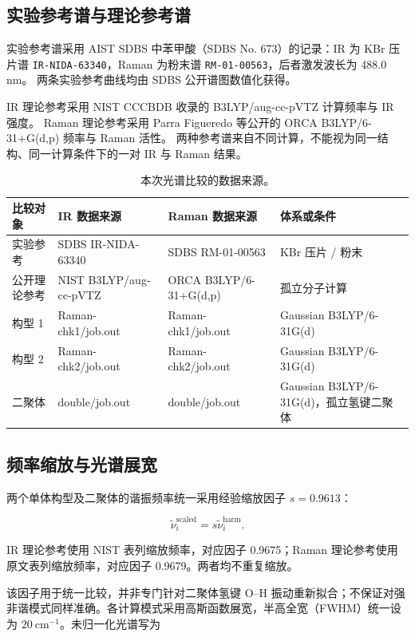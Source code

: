 \documentclass[a4paper,12pt]{article}
\begin{document}
\subsection{实验参考谱与理论参考谱}

实验参考谱采用 AIST SDBS 中苯甲酸（SDBS No. 673）的记录：IR 为 KBr 压片谱 \nolinkurl{IR-NIDA-63340}，Raman 为粉末谱 \nolinkurl{RM-01-00563}，后者激发波长为 488.0 nm。\cite{ref1} 两条实验参考曲线均由 SDBS 公开谱图数值化获得。

IR 理论参考采用 NIST CCCBDB 收录的 B3LYP/aug-cc-pVTZ 计算频率与 IR 强度。\cite{ref2} Raman 理论参考采用 Parra Figueredo 等公开的 ORCA B3LYP/6-31+G(d,p) 频率与 Raman 活性。\cite{ref3} 两种参考谱来自不同计算，不能视为同一结构、同一计算条件下的一对 IR 与 Raman 结果。

\begin{table}[htbp]
\centering
\caption{本次光谱比较的数据来源。}\label{tab:1}
\begingroup\footnotesize\setlength{\tabcolsep}{4pt}
\begin{tabularx}{\textwidth}{YYYY}
\toprule
比较对象 & IR 数据来源 & Raman 数据来源 & 体系或条件 \\
\midrule
实验参考 & SDBS IR-NIDA-63340 & SDBS RM-01-00563 & KBr 压片 / 粉末 \\
公开理论参考 & NIST B3LYP/aug-cc-pVTZ & ORCA B3LYP/6-31+G(d,p) & 孤立分子计算 \\
构型 1 & Raman-chk1/job.out & Raman-chk1/job.out & Gaussian B3LYP/6-31G(d) \\
构型 2 & Raman-chk2/job.out & Raman-chk2/job.out & Gaussian B3LYP/6-31G(d) \\
二聚体 & double/job.out & double/job.out & Gaussian B3LYP/6-31G(d)，孤立氢键二聚体 \\
\bottomrule
\end{tabularx}
\endgroup
\end{table}

\subsection{频率缩放与光谱展宽}

两个单体构型及二聚体的谐振频率统一采用经验缩放因子 $s=0.9613$：\cite{ref4}

\[
\tilde\nu_i^{\mathrm{scaled}}=s\tilde\nu_i^{\mathrm{harm}}.
\]

IR 理论参考使用 NIST 表列缩放频率，对应因子 0.9675；Raman 理论参考使用原文表列缩放频率，对应因子 0.9679。两者均不重复缩放。

该因子用于统一比较，并非专门针对二聚体氢键 O–H 振动重新拟合；不保证对强非谐模式同样准确。各计算模式采用高斯函数展宽，半高全宽（FWHM）统一设为 $20\ \mathrm{cm^{-1}}$。未归一化光谱写为
\end{document}
